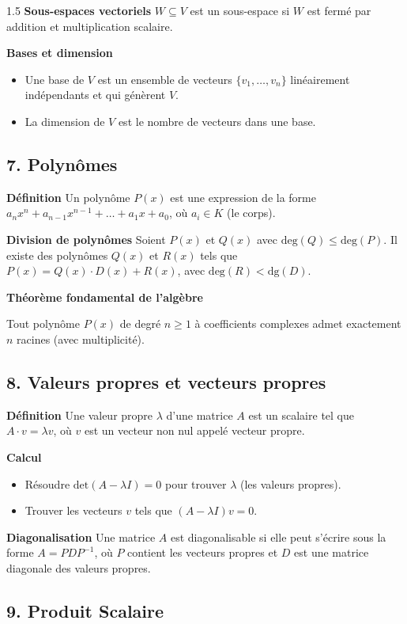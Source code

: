 \documentclass[12pt]{article}
\begin{document}
\begin{spacing}{1.5}
\textbf{Sous-espaces vectoriels}
$W \subseteq V$ est un sous-espace si $W$ est fermé par addition et multiplication scalaire.

\textbf{Bases et dimension}
\begin{itemize}
    \item Une base de $V$ est un ensemble de vecteurs $\{v_1, \dots, v_n\}$ linéairement indépendants et qui génèrent $V$.
    \item La dimension de $V$ est le nombre de vecteurs dans une base.
\end{itemize}

\subsection*{7. Polynômes}
\textbf{Définition}
Un polynôme $P(x)$ est une expression de la forme $a_nx^n + a_{n-1}x^{n-1} + \dots + a_1x + a_0$, où $a_i \in K$ (le corps).

\textbf{Division de polynômes}
Soient $P(x)$ et $Q(x)$ avec $\text{deg}(Q) \leq \text{deg}(P)$. Il existe des polynômes $Q(x)$ et $R(x)$ tels que $P(x) = Q(x) \cdot D(x) + R(x)$, avec $\text{deg}(R) < \text{dg}(D)$.

\textbf{Théorème fondamental de l'algèbre}

Tout polynôme $P(x)$ de degré $n \geq 1$ à coefficients complexes admet exactement $n$ racines (avec multiplicité).

\subsection*{8. Valeurs propres et vecteurs propres}
\textbf{Définition}
Une valeur propre $\lambda$ d'une matrice $A$ est un scalaire tel que $A \cdot v = \lambda v$, où $v$ est un vecteur non nul appelé vecteur propre.

\textbf{Calcul}
\begin{itemize}
    \item Résoudre $\text{det}(A - \lambda I) = 0$ pour trouver $\lambda$ (les valeurs propres).
    \item Trouver les vecteurs $v$ tels que $(A - \lambda I)v = 0$.
\end{itemize}

\textbf{Diagonalisation}
Une matrice $A$ est diagonalisable si elle peut s'écrire sous la forme $A = PDP^{-1}$, où $P$ contient les vecteurs propres et $D$ est une matrice diagonale des valeurs propres.

\subsection*{9. Produit Scalaire}


\end{spacing}
\end{document}
